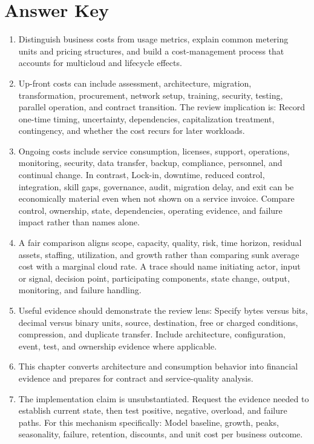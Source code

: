 \documentclass[11pt]{article}
\begin{document}
\section{Answer Key}
\begin{enumerate}
\item Distinguish business costs from usage metrics, explain common metering units and pricing structures, and build a cost-management process that accounts for multicloud and lifecycle effects.
\item Up-front costs can include assessment, architecture, migration, transformation, procurement, network setup, training, security, testing, parallel operation, and contract transition. The review implication is: Record one-time timing, uncertainty, dependencies, capitalization treatment, contingency, and whether the cost recurs for later workloads.
\item Ongoing costs include service consumption, licenses, support, operations, monitoring, security, data transfer, backup, compliance, personnel, and continual change. In contrast, Lock-in, downtime, reduced control, integration, skill gaps, governance, audit, migration delay, and exit can be economically material even when not shown on a service invoice. Compare control, ownership, state, dependencies, operating evidence, and failure impact rather than names alone.
\item A fair comparison aligns scope, capacity, quality, risk, time horizon, residual assets, staffing, utilization, and growth rather than comparing sunk average cost with a marginal cloud rate. A trace should name initiating actor, input or signal, decision point, participating components, state change, output, monitoring, and failure handling.
\item Useful evidence should demonstrate the review lens: Specify bytes versus bits, decimal versus binary units, source, destination, free or charged conditions, compression, and duplicate transfer. Include architecture, configuration, event, test, and ownership evidence where applicable.
\item This chapter converts architecture and consumption behavior into financial evidence and prepares for contract and service-quality analysis.
\item The implementation claim is unsubstantiated. Request the evidence needed to establish current state, then test positive, negative, overload, and failure paths. For this mechanism specifically: Model baseline, growth, peaks, seasonality, failure, retention, discounts, and unit cost per business outcome.

\end{enumerate}
\end{document}
